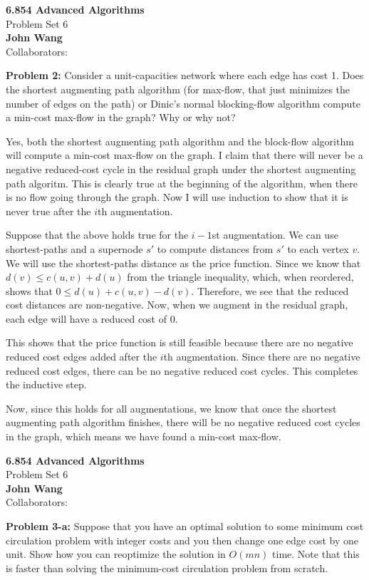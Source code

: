 \documentclass[psamsfonts]{amsart}
\newenvironment{sol}{\vspace{0.25cm}{\large \bfseries Solution:}}{\qedsymbol}
\newenvironment{prob}[1]{\begin{framed}{\large \bfseries Problem #1:}}{\end{framed}}
\newcommand{\makenewtitle}{
    \begin{center}
    {\huge \bfseries 6.854 Advanced Algorithms} \\
    Problem Set 6\\
    \vspace{0.25cm}
    {\bfseries John Wang} \\
    Collaborators: 
    \end{center}
    \vspace{0.5cm}
}
\begin{document}
\newpage
\makenewtitle

\begin{prob}{2}
Consider a unit-capacities network where each edge has cost 1. Does the shortest augmenting path algorithm (for max-flow, that just minimizes the number of edges on the path) or Dinic's normal blocking-flow algorithm compute a min-cost max-flow in the graph? Why or why not?
\end{prob}
\begin{sol}
Yes, both the shortest augmenting path algorithm and the block-flow algorithm will compute a min-cost max-flow on the graph. I claim that there will never be a negative reduced-cost cycle in the residual graph under the shortest augmenting path algoritm. This is clearly true at the beginning of the algorithm, when there is no flow going through the graph. Now I will use induction to show that it is never true after the $i$th augmentation. 

Suppose that the above holds true for the $i-1$st augmentation. We can use shortest-paths and a supernode $s'$ to compute distances from $s'$ to each vertex $v$. We will use the shortest-paths distance as the price function. Since we know that $d(v) \leq c(u,v) + d(u)$ from the triangle inequality, which, when reordered, shows that $0 \leq d(u) + c(u,v) - d(v)$. Therefore, we see that the reduced cost distances are non-negative. Now, when we augment in the residual graph, each edge will have a reduced cost of 0.

This shows that the price function is still feasible because there are no negative reduced cost edges added after the $i$th augmentation. Since there are no negative reduced cost edges, there can be no negative reduced cost cycles. This completes the inductive step. 

Now, since this holds for all augmentations, we know that once the shortest augmenting path algorithm finishes, there will be no negative reduced cost cycles in the graph, which means we have found a min-cost max-flow.  
\end{sol}

\newpage
\makenewtitle

\begin{prob}{3-a}
Suppose that you have an optimal solution to some minimum cost circulation problem with integer costs and you then change one edge cost by one unit. Show how you can reoptimize the solution in $O(mn)$ time. Note that this is faster than solving the minimum-cost circulation problem from scratch.
\end{prob}
\end{document}
